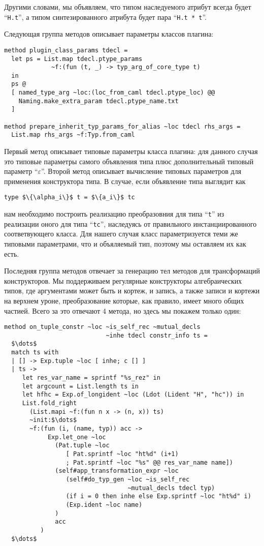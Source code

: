 Другими словами, мы объявляем, что типом наследуемого атрибут всегда будет 
 ``\lstinline{H.t}'', а типом синтезированного атрибута будет пара
``\lstinline{H.t * t}''.

Следующая группа методов описывает параметры классов плагина:

\begin{lstlisting}
method plugin_class_params tdecl =
  let ps = List.map tdecl.ptype_params 
             ~f:(fun (t, _) -> typ_arg_of_core_type t)
  in
  ps @
  [ named_type_arg ~loc:(loc_from_caml tdecl.ptype_loc) @@
    Naming.make_extra_param tdecl.ptype_name.txt
  ]

method prepare_inherit_typ_params_for_alias ~loc tdecl rhs_args =
  List.map rhs_args ~f:Typ.from_caml
\end{lstlisting}

Первый метод описывает типовые параметры класса плагина: для данного случая это типовые параметры самого объявления типа плюс дополнительный типовый параметр 
``$\varepsilon$''. Второй метод описывает вычисление типовых параметров для применения конструктора типа. В случае, если объявление типа выглядит как 

\begin{lstlisting}
type $\{\alpha_i\}$ t = $\{a_i\}$ tc
\end{lstlisting}

нам необходимо построить реализацию преобразовния для типа ``\lstinline{t}'' 
из реализации оного для типа  ``\lstinline{tc}'', наследуясь от правильного 
инстанциированного соответвующего класса. Для нашего случая класс параметризуется теми же 
типовыми параметрами, что и объяляемый тип, поэтому мы оставляем их как есть.

Последняя группа методов отвечает за генерацию тел методов для трансформаций  конструкторов.
Мы поддерживаем регулярные конструкторы алгебраических типов, где аргументами может быть и кортеж, и запись, а также записи и кортежи на верхнем уроне, преобразование которые, как правило, имеет много общих частией. Всего за это отвечают 4 метода, но здесь мы покажем только один:

\begin{lstlisting}
method on_tuple_constr ~loc ~is_self_rec ~mutual_decls 
                            ~inhe tdecl constr_info ts =
  $\dots$ 
  match ts with
  | [] -> Exp.tuple ~loc [ inhe; c [] ]
  | ts ->
     let res_var_name = sprintf "%s_rez" in
     let argcount = List.length ts in
     let hfhc = Exp.of_longident ~loc (Ldot (Lident "H", "hc")) in
     List.fold_right
       (List.mapi ~f:(fun n x -> (n, x)) ts)
       ~init:$\dots$
       ~f:(fun (i, (name, typ)) acc ->
            Exp.let_one ~loc
              (Pat.tuple ~loc 
                 [ Pat.sprintf ~loc "ht%d" (i+1)
                 ; Pat.sprintf ~loc "%s" @@ res_var_name name])
              (self#app_transformation_expr ~loc
                 (self#do_typ_gen ~loc ~is_self_rec 
                                  ~mutual_decls tdecl typ)
                 (if i = 0 then inhe else Exp.sprintf ~loc "ht%d" i)
                 (Exp.ident ~loc name)
              )
              acc
          )
  $\dots$
\end{lstlisting}


